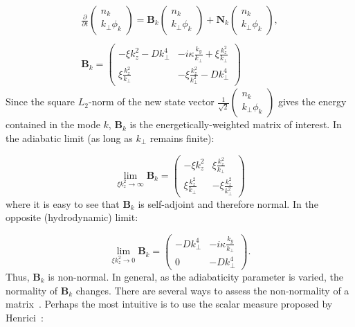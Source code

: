 \documentclass[twocolumn,showkeys,superscriptaddress]{revtex4}
\def\beq{\begin{equation}}
\def\eeq{\end{equation}}
\def\beqar{\begin{eqnarray}}
\def\eeqar{\end{eqnarray}}
\begin{document}
\beqar
\label{fourier_en_eqn}
\frac{\partial}{\partial t} \left( \begin{array}{cc} n_k \\ k_\perp \phi_k \end{array} \right) = \mathbf{B}_k \left( \begin{array}{cc} n_k \\ k_\perp \phi_k \end{array} \right) + \mathbf{N}_k \left( \begin{array}{cc} n_k \\ k_\perp \phi_k \end{array} \right), \\ \nonumber \\
\label{B_k}
\mathbf{B}_k = \left( \begin{array}{cc} -\xi k_z^2 - D k_\perp^4 & -i \kappa \frac{k_y}{k_\perp} + \xi \frac{k_z^2}{k_\perp} \\  \xi \frac{k_z^2}{k_\perp} & - \xi \frac{k_z^2}{k_\perp^2} - D k_\perp^4\end{array} \right)
\eeqar
Since the square $L_2$-norm of the new state vector $\frac{1}{\sqrt{2}} \left( \begin{array}{cc} n_k \\ k_\perp \phi_k \end{array} \right)$ gives the energy contained in the mode $k$,
$\mathbf{B}_k$ is the energetically-weighted matrix of interest. In the adiabatic limit (as long as $k_\perp$ remains finite):

\beq
\label{B_norm_limit}
\displaystyle\lim_{\xi k_z^2 \to \infty} \mathbf{B}_k = \left( \begin{array}{cc} -\xi k_z^2 & \xi \frac{k_z^2}{k_\perp} \\  \xi \frac{k_z^2}{k_\perp} & - \xi \frac{k_z^2}{k_\perp^2} \end{array} \right)
\eeq
where it is easy to see that $\mathbf{B}_k$ is self-adjoint and therefore normal. In the opposite (hydrodynamic) limit:

\beq
\label{B_norm_limit0}
\displaystyle\lim_{\xi k_z^2 \to 0} \mathbf{B}_k = \left( \begin{array}{cc} - D k_\perp^4 & -i \kappa \frac{k_y}{k_\perp} \\ 0  & - D k_\perp^4\end{array} \right).
\eeq
Thus, $\mathbf{B}_k$ is non-normal. In general, as the adiabaticity parameter is varied, the normality of $\mathbf{B}_k$ changes. There are several ways to assess the non-normality of a matrix~\cite{trefethen2005}.
Perhaps the most intuitive is to use the scalar measure proposed by Henrici~\cite{henrici1962}:
\end{document}

